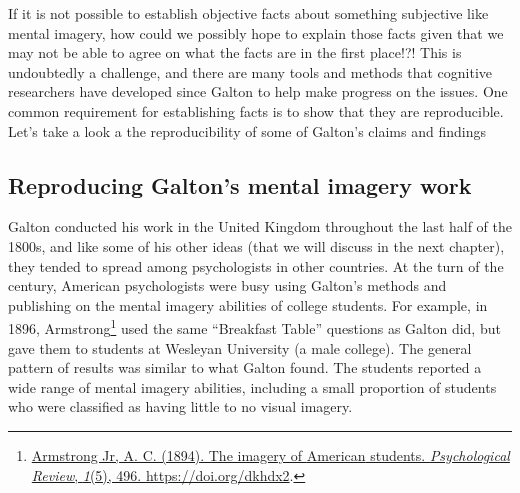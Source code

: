 \documentclass[
  oneside,
  12pt]{crumpbook}
\begin{document}
If it is not possible to establish objective facts about something subjective like mental imagery, how could we possibly hope to explain those facts given that we may not be able to agree on what the facts are in the first place!?! This is undoubtedly a challenge, and there are many tools and methods that cognitive researchers have developed since Galton to help make progress on the issues. One common requirement for establishing facts is to show that they are reproducible. Let's take a look a the reproducibility of some of Galton's claims and findings

\hypertarget{reproducing-galtons-mental-imagery-work}{%
\subsection{Reproducing Galton's mental imagery work}\label{reproducing-galtons-mental-imagery-work}}

Galton conducted his work in the United Kingdom throughout the last half of the 1800s, and like some of his other ideas (that we will discuss in the next chapter), they tended to spread among psychologists in other countries. At the turn of the century, American psychologists were busy using Galton's methods and publishing on the mental imagery abilities of college students. For example, in 1896, Armstrong\footnote{\protect\hyperlink{ref-armstrongjrImageryAmericanStudents1894}{Armstrong Jr, A. C. (1894). The imagery of {American} students. \emph{Psychological Review}, \emph{1}(5), 496. \url{https://doi.org/dkhdx2}}.} used the same ``Breakfast Table'' questions as Galton did, but gave them to students at Wesleyan University (a male college). The general pattern of results was similar to what Galton found. The students reported a wide range of mental imagery abilities, including a small proportion of students who were classified as having little to no visual imagery.
\end{document}
